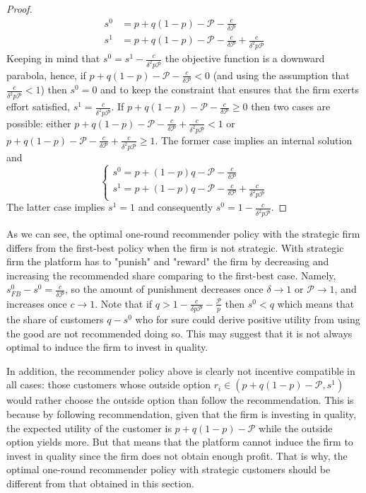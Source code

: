 \documentclass[a4paper]{article}
\begin{document}
\begin{proof}
\begin{align}
	s^0 &= p + q(1-p) - \mathcal{P} - \frac{c}{\delta \mathcal{P}} \nonumber\\
	s^1 &= p + q(1-p) - \mathcal{P} - \frac{c}{\delta \mathcal{P}} + \frac{c}{\delta^2 p \mathcal{P}}
	\end{align}
	Keeping in mind that $s^0 = s^1 - \frac{c}{\delta^2 p \mathcal{P}}$ the objective function is a downward parabola, hence, if $p+q(1-p) - \mathcal{P} - \frac{c}{\delta \mathcal{P}} < 0$ (and using the assumption that $\frac{c}{\delta^2 p \mathcal{P}} < 1$) then $s^0 = 0$ and to keep the constraint that ensures that the firm exerts effort satisfied, $s^1 = \frac{c}{\delta^2 p \mathcal{P}}$. If $p+q(1-p) - \mathcal{P} - \frac{c}{\delta \mathcal{P}} \ge 0$ then two cases are possible: either $p+q(1-p) - \mathcal{P} - \frac{c}{\delta \mathcal{P}} + \frac{c}{\delta^2 p \mathcal{P}} < 1$ or $p+q(1-p) - \mathcal{P} - \frac{c}{\delta \mathcal{P}} + \frac{c}{\delta^2 p \mathcal{P}} \ge 1$. The former case implies an internal solution and $$\begin{cases}s^0 = p+(1-p)q - \mathcal{P} - \frac{c}{\delta \mathcal{P}}\\ s^1 = p+(1-p)q - \mathcal{P} - \frac{c}{\delta \mathcal{P}} + \frac{c}{\delta^2 p \mathcal{P}} \end{cases}$$
	The latter case implies $s^1 = 1$ and consequently $s^0 = 1 - \frac{c}{\delta^2 p \mathcal{P}}$.
\end{proof}
As we can see, the optimal one-round recommender policy with the strategic firm differs from the first-best policy when the firm is not strategic. With strategic firm the platform has to "punish" and "reward" the firm by decreasing and increasing the recommended share comparing to the first-best case. Namely, $s^0_{FB} - s^0 = \frac{c}{\delta \mathcal{P}}$, so the amount of punishment decreases once $\delta \to 1$ or $\mathcal{P} \to 1$, and increases once $c \to 1$. Note that if $q > 1 - \frac{c}{\delta p \mathcal{P}} - \frac{\mathcal{P}}{p}$ then $s^0 < q$ which means that the share of customers $q - s^0$ who for sure could derive positive utility from using the good are not recommended doing so. This may suggest that it is not always optimal to induce the firm to invest in quality.



In addition, the recommender policy above is clearly not incentive compatible in all cases: those customers whose outside option $r_i \in \left(p+q(1-p) - \mathcal{P}, s^1 \right)$ would rather choose the outside option than follow the recommendation. This is because by following recommendation, given that the firm is investing in quality, the expected utility of the customer is $p + q(1-p) - \mathcal{P}$ while the outside option yields more. But that means that the platform cannot induce the firm to invest in quality since the firm does not obtain enough profit. That is why, the optimal one-round recommender policy with strategic customers should be different from that obtained in this section.
\end{document}
